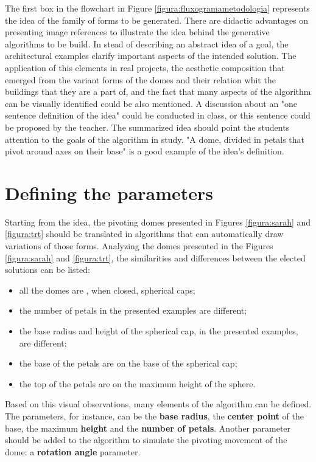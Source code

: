\documentclass[preprint,12pt,3p]{elsarticle}
\begin{document}
The first box in the flowchart in Figure \ref{figura:fluxogramametodologia} represents the idea of the family of forms to be generated. There are didactic advantages on presenting image references to illustrate the idea behind the generative algorithms to be build. In stead of describing an abstract idea of a goal, the architectural examples clarify important aspects of the intended solution. The application of this elements in real projects, the aesthetic composition that emerged from the variant forms of the domes and their relation whit the buildings that they are a part of, and the fact that many aspects of the algorithm can be visually identified could be also mentioned. A discussion about an "one sentence definition of the idea" could be conducted in class, or this sentence could be proposed by the teacher. The summarized idea should point the students attention to the goals of the algorithm in study. "A dome, divided in petals that pivot around axes on their base" is a good example of the idea's definition.


\section{Defining the parameters}
\label{implem}

Starting from the idea, the pivoting domes presented in Figures \ref{figura:sarah} and \ref{figura:trt} should be translated in algorithms that can automatically draw variations of those forms. Analyzing the domes presented in the Figures \ref{figura:sarah} and \ref{figura:trt}, the similarities and differences between the elected solutions can be listed:

\begin{itemize}
\item all the domes are , when closed, spherical caps;
\item the number of petals in the presented examples are different;
\item the base radius and height of the spherical cap, in the presented examples, are different;
\item the base of the petals are on the base of the spherical cap;
\item the top of the petals are on the maximum height of the sphere.
\end{itemize}

Based on this visual observations, many elements of the algorithm can be defined. The parameters, for instance, can be the \textbf{base radius}, the \textbf{center point} of the base, the maximum \textbf{height} and the \textbf{number of petals}. Another parameter should be added to the algorithm to simulate the pivoting movement of the dome: a \textbf{rotation angle} parameter.
\end{document}
